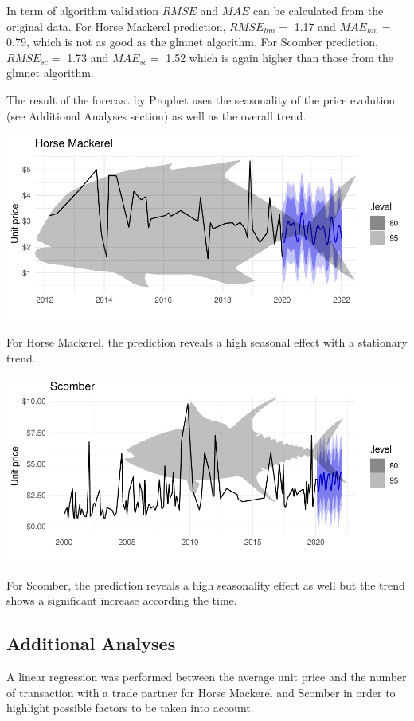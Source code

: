 \documentclass[10,a4paperpaper,]{article}
\begin{document}
In term of algorithm validation \(RMSE\) and \(MAE\) can be calculated
from the original data. For Horse Mackerel prediction, \(RMSE_{hm} =\)
1.17 and \(MAE_{hm} =\) 0.79, which is not as good as the glmnet
algorithm. For Scomber prediction, \(RMSE_{sc} =\) 1.73 and
\(MAE_{sc} =\) 1.52 which is again higher than those from the glmnet
algorithm.

The result of the forecast by Prophet uses the seasonality of the price
evolution (see Additional Analyses section) as well as the overall
trend.

\includegraphics{report_files/figure-latex/unnamed-chunk-21-1.pdf}

For Horse Mackerel, the prediction reveals a high seasonal effect with a
stationary trend.

\includegraphics{report_files/figure-latex/unnamed-chunk-22-1.pdf}

For Scomber, the prediction reveals a high seasonality effect as well
but the trend shows a significant increase according the time.

\subsection{Additional Analyses}

A linear regression was performed between the average unit price and the
number of transaction with a trade partner for Horse Mackerel and
Scomber in order to highlight possible factors to be taken into account.
\end{document}
